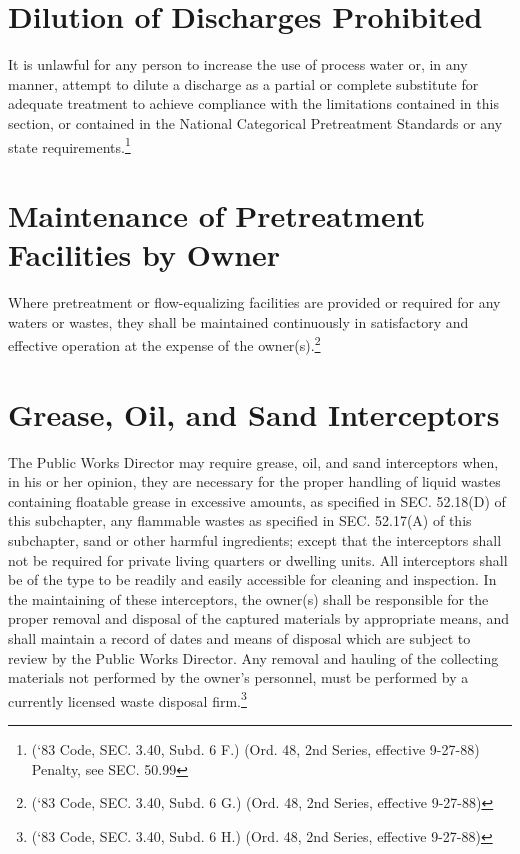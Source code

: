 \section{Dilution of Discharges Prohibited}
It is unlawful for any person to increase the use of process water or, in any manner, attempt to dilute a discharge as a partial or complete substitute for adequate treatment to achieve compliance with the limitations contained in this section, or contained in the National Categorical Pretreatment Standards or any state requirements.\footnote{(‘83 Code, SEC. 3.40, Subd. 6 F.) (Ord. 48, 2nd Series, effective 9-27-88) Penalty, see SEC. 50.99}

\section{Maintenance of Pretreatment Facilities by Owner}
Where pretreatment or flow-equalizing facilities are provided or required for any waters or wastes, they shall be maintained continuously in satisfactory and effective operation at the expense of the owner(s).\footnote{(‘83 Code, SEC. 3.40, Subd. 6 G.) (Ord. 48, 2nd Series, effective 9-27-88)}

\section{Grease, Oil, and Sand Interceptors}
The Public Works Director may require grease, oil, and sand interceptors when, in his or her opinion, they are necessary for the proper handling of liquid wastes containing floatable grease in excessive amounts, as specified in SEC. 52.18(D) of this subchapter, any flammable wastes as specified in SEC. 52.17(A) of this subchapter, sand or other harmful ingredients; except that the interceptors shall not be required for private living quarters or dwelling units.  All interceptors shall be of the type to be readily and easily accessible for cleaning and inspection.  In the maintaining of these interceptors, the owner(s) shall be responsible for the proper removal and disposal of the captured materials by appropriate means, and shall maintain a record of dates and means of disposal which are subject to review by the Public Works Director.  Any removal and hauling of the collecting materials not performed by the owner’s personnel, must be performed by a currently licensed waste disposal firm.\footnote{(‘83 Code, SEC. 3.40, Subd. 6 H.) (Ord. 48, 2nd Series, effective 9-27-88)}\\


